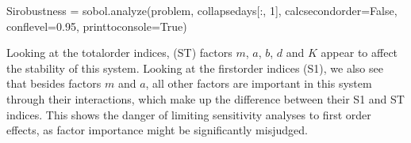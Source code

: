 \documentclass[letterpaper,10pt,english]{book}
\begin{document}
\begin{sphinxVerbatim}[commandchars=\\\{\}]
Si\PYGZus{}robustness = sobol.analyze(problem,
                              collapse\PYGZus{}days[:, 1],
                              calc\PYGZus{}second\PYGZus{}order=False,
                              conf\PYGZus{}level=0.95,
                              print\PYGZus{}to\PYGZus{}console=True)
\end{sphinxVerbatim}

\begin{sphinxVerbatim}[commandchars=\\\{\}]
                 
         
         
         
         
         
         
         
    
    
                 
         
         
        
         
         
         
         
   
   
\end{sphinxVerbatim}

\sphinxAtStartPar
Looking at the total\sphinxhyphen{}order indices, (ST) factors \(m\), \(a\),
\(b\), \(d\) and \(K\) appear to affect the stability of
this system. Looking at the first\sphinxhyphen{}order indices (S1), we also see that
besides factors \(m\) and \(a\), all other factors are important
in this system through their interactions, which make up the difference
between their S1 and ST indices. This shows the danger of limiting
sensitivity analyses to first order effects, as factor importance might
be significantly misjudged.
\end{document}
